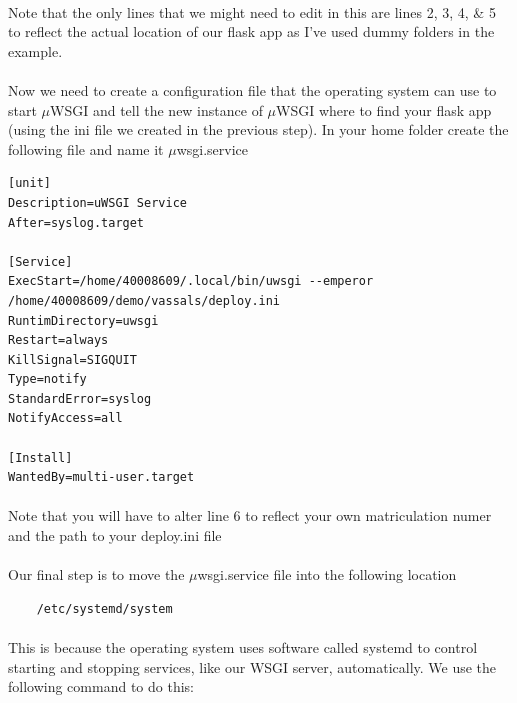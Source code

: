 \documentclass[12pt, a4paper, oneside]{book}
\begin{document}
\paragraph{} Note that the only lines that we might need to edit in this are lines 2, 3, 4, \& 5 to reflect the actual location of our flask app as I've used dummy folders in the example.

\paragraph{} Now we need to create a configuration file that the operating system can use to start $\mu$WSGI and tell the new instance of $\mu$WSGI where to find your flask app (using the ini file we created in the previous step). In your home folder create the following file and name it $\mu$wsgi.service

\begin{lstlisting}
[unit]
Description=uWSGI Service
After=syslog.target

[Service]
ExecStart=/home/40008609/.local/bin/uwsgi --emperor /home/40008609/demo/vassals/deploy.ini
RuntimDirectory=uwsgi
Restart=always
KillSignal=SIGQUIT
Type=notify
StandardError=syslog
NotifyAccess=all

[Install]
WantedBy=multi-user.target
\end{lstlisting}

\paragraph{} Note that you will have to alter line 6 to reflect your own matriculation numer and the path to your deploy.ini file

\paragraph{} Our final step is to move the $\mu$wsgi.service file into the following location

\begin{lstlisting}
    /etc/systemd/system
\end{lstlisting}

\paragraph{} This is because the operating system uses software called systemd to control starting and stopping services, like our WSGI server, automatically. We use the following command to do this:
\end{document}

